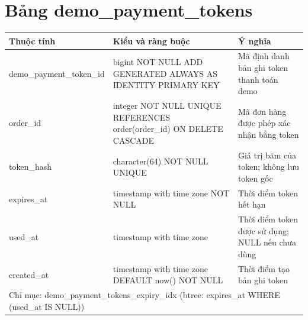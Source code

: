 \section{Bảng demo\_payment\_tokens}
\begin{longtable}{|p{}|p{}|p{}|}\hline
\textbf{Thuộc tính}&\textbf{Kiểu và ràng buộc}&\textbf{Ý nghĩa}\\\hline\endhead
demo\_payment\_token\_id & bigint NOT NULL ADD GENERATED ALWAYS AS IDENTITY PRIMARY KEY & Mã định danh bản ghi token thanh toán demo\\\hline
order\_id & integer NOT NULL UNIQUE REFERENCES order(order\_id) ON DELETE CASCADE & Mã đơn hàng được phép xác nhận bằng token\\\hline
token\_hash & character(64) NOT NULL UNIQUE & Giá trị băm của token; không lưu token gốc\\\hline
expires\_at & timestamp with time zone NOT NULL & Thời điểm token hết hạn\\\hline
used\_at & timestamp with time zone & Thời điểm token được sử dụng; NULL nếu chưa dùng\\\hline
created\_at & timestamp with time zone DEFAULT now() NOT NULL & Thời điểm tạo bản ghi token\\\hline
\multicolumn{3}{|p{0.93\textwidth}|}{Chỉ mục: demo\_payment\_tokens\_expiry\_idx (btree: expires\_at WHERE (used\_at IS NULL))}\\\hline
\end{longtable}
\normalsize
